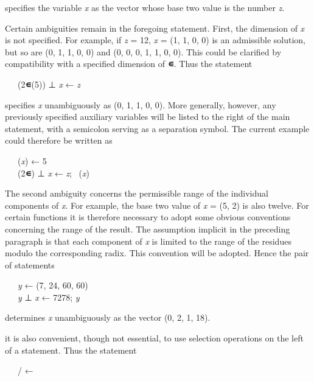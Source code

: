 \par specifies the variable \textit{x} as the vector whose base two value is the number \textit{z}.

\par Certain ambiguities remain in the foregoing statement. First, the dimension of \textit{x} is not specified. For example, if \textit{z} = 12, 
\textit{x} = (1, 1, 0, 0) is an admissible solution, but so are (0, 1, 1, 0, 0) and (0, 0, 0, 1, 1, 0, 0). This could be clarified by compatibility with a specified dimension of \textbf{∊}. Thus the statement

\par \ \ \ (2\textbf{∊}(5)) ⊥ \textit{x} ← \textit{z}

\par specifies \textit{x} unambiguously as (0, 1, 1, 0, 0). More generally, however, any previously specified auxiliary variables will be listed to the right of the main statement, with a semicolon serving as a separation symbol. The current example could therefore be written as

\par \ \ \ \textit{\nu}(\textit{x}) ← 5\\ \ \ \ (2\textbf{∊}) ⊥ \textit{x} ← 
\textit{z}; \ \textit{\nu}(\textit{x})

\par The second ambiguity concerns the permissible range of the individual components of \textit{x}. For example, the base two value of \textit{x} = (5, 2) is also twelve. For certain functions it is therefore necessary to adopt some obvious conventions concerning the range of the result. The assumption implicit in the preceding paragraph is that each component of \textit{x} is limited to the range of the residues modulo the corresponding radix. This convention will be adopted. Hence the pair of statements

\par \ \ \ \textit{y} ← (7, 24, 60, 60)\\ \ \ \ \textit{y} ⊥ \textit{x} ← 7278; \textit{y}

\par determines \textit{x} unambiguously as the vector (0, 2, 1, 18).

\par it is also convenient, though not essential, to use selection operations on the left of a statement. Thus the statement

\par \ \ \ / ← 

